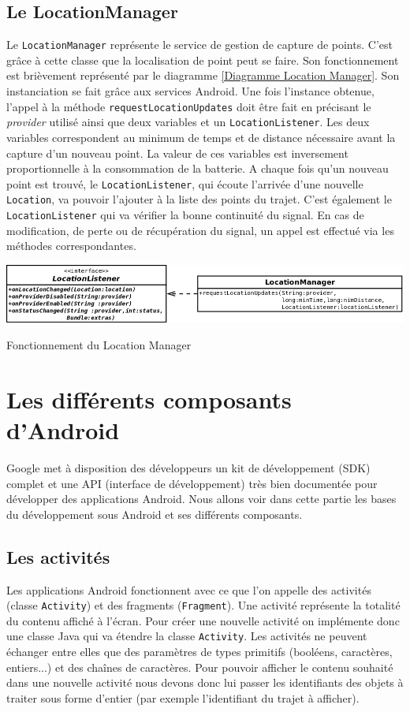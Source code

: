 \subsection{Le LocationManager}
\label{locationManager}
Le \verb!LocationManager! représente le service de gestion de capture de points. C'est grâce à cette classe que la localisation de point peut se faire. Son fonctionnement est brièvement représenté par le diagramme \ref{Diagramme Location Manager}. Son instanciation se fait grâce aux services Android. Une fois l'instance obtenue, l'appel à la méthode \verb!requestLocationUpdates! doit être fait en précisant le \textit{provider} utilisé ainsi que deux variables et un \verb!LocationListener!. Les deux variables correspondent au minimum de temps et de distance nécessaire avant la capture d'un nouveau point. La valeur de ces variables est inversement proportionnelle à la consommation de la batterie. A chaque fois qu'un nouveau point est trouvé, le \verb!LocationListener!, qui écoute l'arrivée d'une nouvelle \verb!Location!, va pouvoir l'ajouter  à la liste des points du trajet. C'est également le \verb!LocationListener! qui va vérifier la bonne continuité du signal. En cas de modification, de perte ou de récupération du signal, un appel est effectué via les méthodes correspondantes.

\begin{img}  
	\includegraphics[scale=0.65]{img/LocationManager.png}
	\caption{Fonctionnement du Location Manager}
	\label{Diagramme Location Manager}
\end{img}

\section{Les différents composants d'Android}
Google met à disposition des développeurs un kit de développement (SDK) complet et une API (interface de développement) très bien documentée pour développer des applications Android. Nous allons voir dans cette partie les bases du développement sous Android et ses différents composants.
\subsection{Les activités}
Les applications Android fonctionnent avec ce que l'on appelle des activités (classe \verb!Activity!) et des fragments (\verb!Fragment!).
Une activité représente la totalité du contenu affiché à l'écran. Pour créer une nouvelle activité on implémente donc une classe Java qui va étendre la classe \verb!Activity!. Les activités ne peuvent échanger entre elles que des paramètres de types primitifs (booléens, caractères, entiers...) et des chaînes de caractères. Pour pouvoir afficher le contenu souhaité dans une nouvelle activité nous devons donc lui passer les identifiants des objets à traiter sous forme d'entier (par exemple l'identifiant du trajet à afficher).\bigskip

